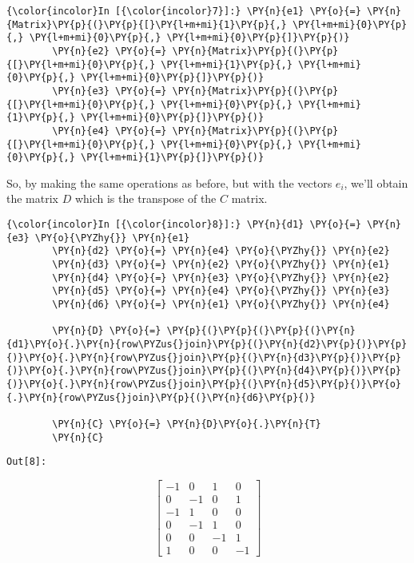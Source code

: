     \begin{Verbatim}[commandchars=\\\{\}]
{\color{incolor}In [{\color{incolor}7}]:} \PY{n}{e1} \PY{o}{=} \PY{n}{Matrix}\PY{p}{(}\PY{p}{[}\PY{l+m+mi}{1}\PY{p}{,} \PY{l+m+mi}{0}\PY{p}{,} \PY{l+m+mi}{0}\PY{p}{,} \PY{l+m+mi}{0}\PY{p}{]}\PY{p}{)}
        \PY{n}{e2} \PY{o}{=} \PY{n}{Matrix}\PY{p}{(}\PY{p}{[}\PY{l+m+mi}{0}\PY{p}{,} \PY{l+m+mi}{1}\PY{p}{,} \PY{l+m+mi}{0}\PY{p}{,} \PY{l+m+mi}{0}\PY{p}{]}\PY{p}{)}
        \PY{n}{e3} \PY{o}{=} \PY{n}{Matrix}\PY{p}{(}\PY{p}{[}\PY{l+m+mi}{0}\PY{p}{,} \PY{l+m+mi}{0}\PY{p}{,} \PY{l+m+mi}{1}\PY{p}{,} \PY{l+m+mi}{0}\PY{p}{]}\PY{p}{)}
        \PY{n}{e4} \PY{o}{=} \PY{n}{Matrix}\PY{p}{(}\PY{p}{[}\PY{l+m+mi}{0}\PY{p}{,} \PY{l+m+mi}{0}\PY{p}{,} \PY{l+m+mi}{0}\PY{p}{,} \PY{l+m+mi}{1}\PY{p}{]}\PY{p}{)}
\end{Verbatim}

    So, by making the same operations as before, but with the vectors
\(e_i\), we'll obtain the matrix \(D\) which is the transpose of the
\(C\) matrix.

    \begin{Verbatim}[commandchars=\\\{\}]
{\color{incolor}In [{\color{incolor}8}]:} \PY{n}{d1} \PY{o}{=} \PY{n}{e3} \PY{o}{\PYZhy{}} \PY{n}{e1}
        \PY{n}{d2} \PY{o}{=} \PY{n}{e4} \PY{o}{\PYZhy{}} \PY{n}{e2}
        \PY{n}{d3} \PY{o}{=} \PY{n}{e2} \PY{o}{\PYZhy{}} \PY{n}{e1}
        \PY{n}{d4} \PY{o}{=} \PY{n}{e3} \PY{o}{\PYZhy{}} \PY{n}{e2}
        \PY{n}{d5} \PY{o}{=} \PY{n}{e4} \PY{o}{\PYZhy{}} \PY{n}{e3}
        \PY{n}{d6} \PY{o}{=} \PY{n}{e1} \PY{o}{\PYZhy{}} \PY{n}{e4}

        \PY{n}{D} \PY{o}{=} \PY{p}{(}\PY{p}{(}\PY{p}{(}\PY{n}{d1}\PY{o}{.}\PY{n}{row\PYZus{}join}\PY{p}{(}\PY{n}{d2}\PY{p}{)}\PY{p}{)}\PY{o}{.}\PY{n}{row\PYZus{}join}\PY{p}{(}\PY{n}{d3}\PY{p}{)}\PY{p}{)}\PY{o}{.}\PY{n}{row\PYZus{}join}\PY{p}{(}\PY{n}{d4}\PY{p}{)}\PY{p}{)}\PY{o}{.}\PY{n}{row\PYZus{}join}\PY{p}{(}\PY{n}{d5}\PY{p}{)}\PY{o}{.}\PY{n}{row\PYZus{}join}\PY{p}{(}\PY{n}{d6}\PY{p}{)}

        \PY{n}{C} \PY{o}{=} \PY{n}{D}\PY{o}{.}\PY{n}{T}
        \PY{n}{C}
\end{Verbatim}
\texttt{\color{outcolor}Out[{\color{outcolor}8}]:}


        \begin{equation*}
        \left[\begin{matrix}-1 & 0 & 1 & 0\\0 & -1 & 0 & 1\\-1 & 1 & 0 & 0\\0 & -1 & 1 & 0\\0 & 0 & -1 & 1\\1 & 0 & 0 & -1\end{matrix}\right]
        \end{equation*}




